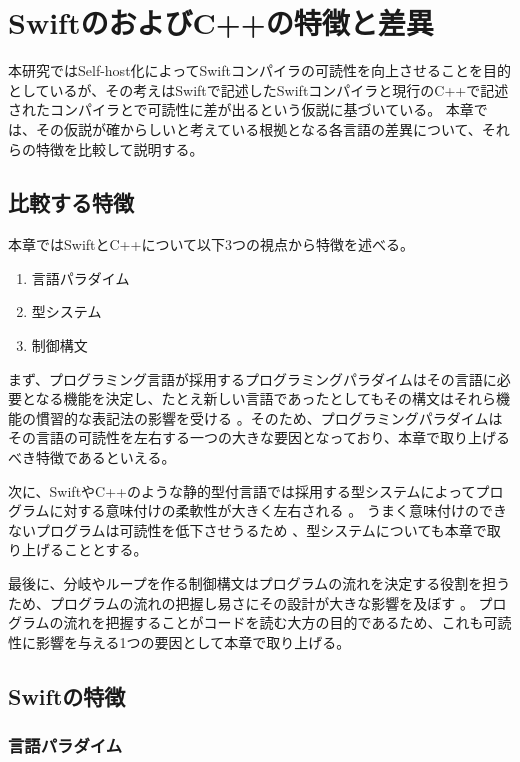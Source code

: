 \chapter{SwiftのおよびC++の特徴と差異}
\label{differential}

本研究ではSelf-host化によってSwiftコンパイラの可読性を向上させることを目的としているが、その考えはSwiftで記述したSwiftコンパイラと現行のC++で記述されたコンパイラとで可読性に差が出るという仮説に基づいている。
本章では、その仮説が確からしいと考えている根拠となる各言語の差異について、それらの特徴を比較して説明する。

\section{比較する特徴}

本章ではSwiftとC++について以下3つの視点から特徴を述べる。

\begin{enumerate}
\item 言語パラダイム
\item 型システム
\item 制御構文
\end{enumerate}

まず、プログラミング言語が採用するプログラミングパラダイムはその言語に必要となる機能を決定し、たとえ新しい言語であったとしてもその構文はそれら機能の慣習的な表記法の影響を受ける
。そのため、プログラミングパラダイムはその言語の可読性を左右する一つの大きな要因となっており、本章で取り上げるべき特徴であるといえる。

次に、SwiftやC++のような静的型付言語では採用する型システムによってプログラムに対する意味付けの柔軟性が大きく左右される
。
うまく意味付けのできないプログラムは可読性を低下させうるため
、型システムについても本章で取り上げることとする。

最後に、分岐やループを作る制御構文はプログラムの流れを決定する役割を担うため、プログラムの流れの把握し易さにその設計が大きな影響を及ぼす
。
プログラムの流れを把握することがコードを読む大方の目的であるため、これも可読性に影響を与える1つの要因として本章で取り上げる。


\section{Swiftの特徴}
\label{differential:swift-features}

\subsection{言語パラダイム}


